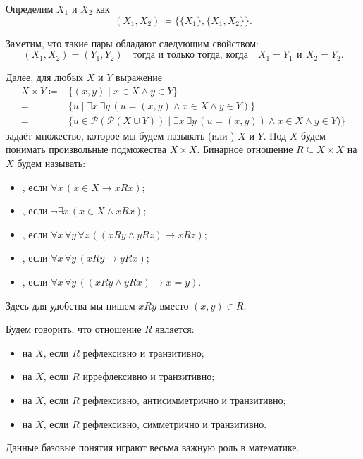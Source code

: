 





Определим  $X_1$ и $X_2$ как
$$
    \left( X_1, X_2 \right) \coloneqq \{\{ X_1 \}, \{ X_1, X_2 \}\}.
$$
        
Заметим, что такие пары обладают следующим свойством:
\begin{equation*}
    (X_1, X_2) = (Y_1, Y_2) \quad \text{тогда и только тогда, когда} \quad
    X_1 = Y_1~\, \text{и}~\, X_2 = Y_2.
\end{equation*}

Далее, для любых $X$ и $Y$ выражение
\begin{align*}
  {X \times Y} \coloneqq&
                          \{ (x, y) \mid x \in X \wedge y \in Y \}\\
  =& \{ u \mid \exists x\, \exists y\, (u = (x, y) \wedge x \in X \wedge y \in Y)\}\\
  =& \{ u \in \mathcal{P} (\mathcal{P} (X \cup Y)) \mid \exists x\, \exists y\, (u = (x, y)) \wedge x \in
     X \wedge y \in Y)\}
\end{align*}
задаёт множество, которое мы будем называть  (или )
 $X$ и $Y$. Под  $X$ будем понимать произвольные
подможества $X \times X$. Бинарное отношение $R \subseteq X \times X$ на $X$ будем называть:
\begin{itemize}
    \item {}, если $\forall x\, (x \in X \rightarrow xRx)$;
    \item {}, если $\neg \exists x\, (x \in X \wedge xRx)$;
    \item {}, если $\forall x\, \forall y\, \forall z\, ((xRy \wedge yRz) \rightarrow
        xRz)$;
    \item {}, если $\forall x\, \forall y\, (xRy \rightarrow yRx)$;
    \item {}, если $\forall x\, \forall y\, ((xRy \wedge yRx) \rightarrow x =
        y)$.
\end{itemize}
Здесь для удобства мы пишем $xRy$ вместо $(x, y) \in R$.

Будем говорить, что отношение $R$ является:
\begin{itemize}
    \item {} на $X$, если $R$ рефлексивно и транзитивно;
    \item {} на $X$, если $R$ иррефлексивно и транзитивно;
    \item {} на $X$, если $R$ рефлексивно, антисимметрично и транзитивно;
    \item {} на $X$, если $R$ рефлексивно, симметрично и транзитивно.
\end{itemize}
Данные базовые понятия играют весьма важную роль в математике.

